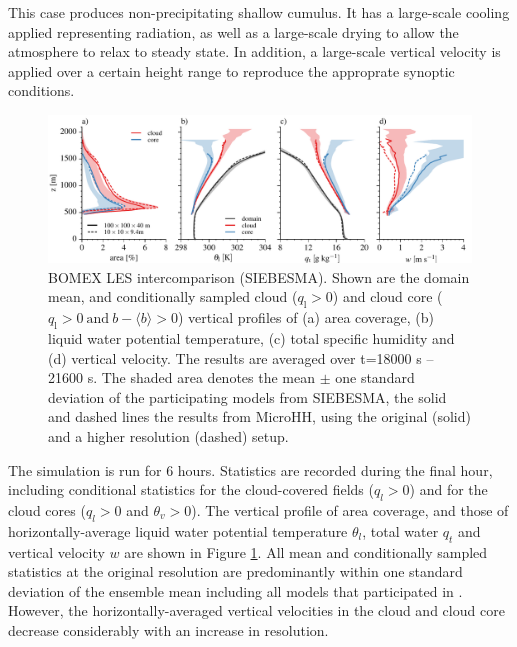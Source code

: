 \documentclass[gmd]{copernicus}
\begin{document}
This case produces non-precipitating shallow cumulus. It has a large-scale cooling applied representing radiation, as well as a large-scale drying to allow the atmosphere to relax to steady state. In addition, a large-scale vertical velocity is applied over a certain height range to reproduce the approprate synoptic conditions. 

\begin{figure}[t]
	\vspace*{2mm}
	\begin{center}
		\includegraphics[width=16.6cm]{figs/gmd_bomex_profs.pdf}
	\end{center}
	\caption{BOMEX LES intercomparison (SIEBESMA). Shown are the domain mean, and conditionally sampled cloud ($q_\mathrm{l} > 0$) and cloud core ($q_\mathrm{l}>0 \ \mathrm{and} \ b-\langle b \rangle > 0$) vertical profiles of (a) area coverage, (b) liquid water potential temperature, (c) total specific humidity and (d) vertical velocity. The results are averaged over t=18000 s -- 21600 s. The shaded area denotes the mean $\pm$ one standard deviation of the participating models from SIEBESMA, the solid and dashed lines the results from MicroHH, using the original (solid) and a higher resolution (dashed) setup.}
	\label{fig:bomex}
\end{figure}

The simulation is run for 6 hours. Statistics are recorded during the final hour, including conditional statistics for the cloud-covered fields ($q_l > 0$) and for the cloud cores ($q_l > 0$ and $\theta_v > 0$). The vertical profile of area coverage, and those of horizontally-average liquid water potential temperature $\theta_l$, total water $q_t$ and vertical velocity $w$ are shown in Figure \ref{fig:bomex}. All mean and conditionally sampled statistics at the original resolution are predominantly within one standard deviation of the ensemble mean including all models that participated in \citet{Siebesma2003}. However, the horizontally-averaged vertical velocities in the cloud and cloud core decrease considerably with an increase in resolution.
\end{document}
